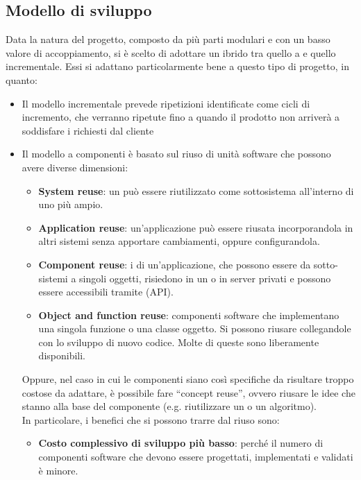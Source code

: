 	\subsection{Modello di sviluppo}
	Data la natura del progetto, composto da più parti modulari e con un basso valore di accoppiamento, si è scelto di adottare un  ibrido tra quello a  e quello incrementale.
	Essi si adattano particolarmente bene a questo tipo di progetto, in quanto:
	\begin{itemize}
		\item Il modello incrementale prevede ripetizioni identificate come cicli di incremento,
		che verranno ripetute fino a quando il prodotto non arriverà a soddisfare i  richiesti dal cliente
		\item Il modello a componenti è basato sul riuso di unità software che possono avere diverse dimensioni:
		\begin{itemize}
			\item \textbf{System reuse}: un  può essere riutilizzato come sottosistema all'interno di uno più ampio.
			\item \textbf{Application reuse}: un'applicazione può essere riusata incorporandola in altri sistemi senza apportare cambiamenti, 
				oppure configurandola.
			\item \textbf{Component reuse}: i  di un'applicazione, che possono essere da sotto-sistemi a singoli oggetti, risiedono
				in un  o in server privati e possono essere accessibili tramite  (API).
			\item \textbf{Object and function reuse}: componenti software che implementano una singola funzione o una classe oggetto. Si 
				possono riusare collegandole con lo sviluppo di nuovo codice. Molte di queste sono liberamente disponibili. 
		\end{itemize}
		Oppure, nel caso in cui le componenti siano così specifiche da risultare troppo costose da adattare,
		è possibile fare ``concept reuse'', ovvero riusare le idee che stanno alla base del componente (e.g. riutilizzare un  o un algoritmo). \\
		In particolare, i benefici che si possono trarre dal riuso sono:
		\begin{itemize}
			\item \textbf{Costo complessivo di sviluppo più basso}: perché il numero di componenti software che devono essere progettati, implementati e validati è minore.

\end{itemize}
\end{itemize}
